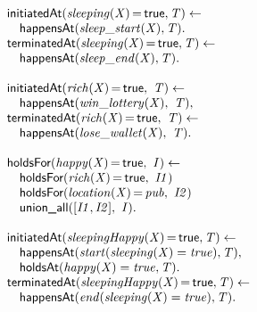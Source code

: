 \documentclass[8pt]{beamer}
\DeclareMathOperator{\val}{=}  %
\def \patsize {}
\def\happensAt{\textsf{\patsize happensAt}}
\def\holdsAt{\textsf{\patsize holdsAt}}
\def\holdsFor{\textsf{\patsize holdsFor}}
\def\initiatedAt{\textsf{\patsize initiatedAt}}
\def\terminatedAt{\textsf{\patsize terminatedAt}}
\def\unionall{\textsf{\patsize union\_all}}
\def\true{\textsf{\patsize true}}
\newenvironment{mysplit}%
  {\arraycolsep 0pt \begin{array}{l}}%
  {\end{array}}
\begin{document}
\begin{frame}
\begin{minipage}{0.48\linewidth}
            \begin{align*}
                \begin{mysplit}
                    \initiatedAt\mathit{(sleeping(X)\val\true,T) \leftarrow}\\
                    \quad    \happensAt\mathit{(sleep\_start(X),T).}\\
                    \terminatedAt\mathit{(sleeping(X)\val\true,T) \leftarrow}\\
                    \quad    \happensAt\mathit{(sleep\_end(X),T).}\\\\
                    \initiatedAt\mathit{(rich(X)\val\true,\ T) \leftarrow}\\
                    \quad    \happensAt\mathit{(win\_lottery(X),\ T),}\\
                    \terminatedAt\mathit{(rich(X)\val\true,\ T) \leftarrow}\\
                    \quad    \happensAt\mathit{(lose\_wallet(X),\ T)}.\\\\
                    \holdsFor\mathit{(happy(X)\val\true,\ I) \leftarrow}\\
                    \quad    \holdsFor\mathit{(rich(X)\val\true,\ I1)}\\
                    \quad    \holdsFor\mathit{(location(X)\val pub,\ I2)}\\
                    \quad    \unionall\mathit{([I1,I2],\ I)}.\\\\
                    \initiatedAt\mathit{(sleepingHappy(X)\val\true,T) \leftarrow}\\
                    \quad    \happensAt\mathit{(start(sleeping(X)=true),T),}\\
                    \quad    \holdsAt\mathit{(happy(X)=true,T).}\\
                    \terminatedAt\mathit{(sleepingHappy(X)\val\true,T) \leftarrow}\\
                    \quad    \happensAt\mathit{(end(sleeping(X)=true),T).}\\\\
                \end{mysplit}
            \end{align*}
        \end{minipage}
    \end{frame}
\end{document}
